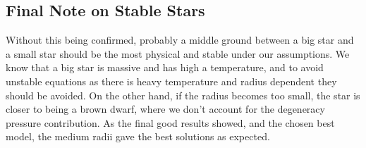\documentclass[11pt,a4paper,twocolumn,titlepage]{article}
\begin{document}
\begin{table}[]
\caption{The final values from the chosen best model in both SI units and scaled with the initial value.}
\label{tab:Final values best model}
\end{table}

\subsection{Final Note on Stable Stars} \label{subsec:conclusion/Stable_star}
Without this being confirmed, probably a middle ground between a big star and a small star should be the most physical and stable under our assumptions. We know that a big star is massive and has high a temperature, and to avoid unstable equations as there is heavy temperature and radius dependent they should be avoided. On the other hand, if the radius becomes too small, the star is closer to being a brown dwarf, where we don't account for the degeneracy pressure contribution. As the final good results showed, and the chosen best model, the medium radii gave the best solutions as expected.
\end{document}
